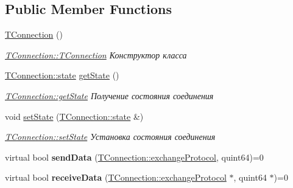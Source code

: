 \subsection*{Public Member Functions}
\begin{DoxyCompactItemize}
\item 
\mbox{\label{class_t_connection_a3457e15061be61110b825fd1760e3834}} 
\hyperlink{class_t_connection_a3457e15061be61110b825fd1760e3834}{T\+Connection} ()
\begin{DoxyCompactList}\small\item\em \hyperlink{class_t_connection_a3457e15061be61110b825fd1760e3834}{T\+Connection\+::\+T\+Connection} Конструктор класса \end{DoxyCompactList}\item 
\hyperlink{class_t_connection_a93c51547a49faa91936324245c95b7b3}{T\+Connection\+::state} \hyperlink{class_t_connection_a3d5a8ced525102cb5af69c5b3bf53beb}{get\+State} ()
\begin{DoxyCompactList}\small\item\em \hyperlink{class_t_connection_a3d5a8ced525102cb5af69c5b3bf53beb}{T\+Connection\+::get\+State} Получение состояния соединения \end{DoxyCompactList}\item 
void \hyperlink{class_t_connection_a93e5bd39a1a222d697d94cf5a686fe48}{set\+State} (\hyperlink{class_t_connection_a93c51547a49faa91936324245c95b7b3}{T\+Connection\+::state} \&)
\begin{DoxyCompactList}\small\item\em \hyperlink{class_t_connection_a93e5bd39a1a222d697d94cf5a686fe48}{T\+Connection\+::set\+State} Установка состояния соединения \end{DoxyCompactList}\item 
\mbox{\label{class_t_connection_a814aa8aa0c8d84ddbd1a054b9bf5752a}} 
virtual bool {\bfseries send\+Data} (\hyperlink{class_t_connection_aa46ea2e762c48455dece26c126251aeb}{T\+Connection\+::exchange\+Protocol}, quint64)=0
\item 
\mbox{\label{class_t_connection_a7ab37e437c1b9b7396055e3be9582f92}} 
virtual bool {\bfseries receive\+Data} (\hyperlink{class_t_connection_aa46ea2e762c48455dece26c126251aeb}{T\+Connection\+::exchange\+Protocol} $\ast$, quint64 $\ast$)=0
\end{DoxyCompactItemize}
